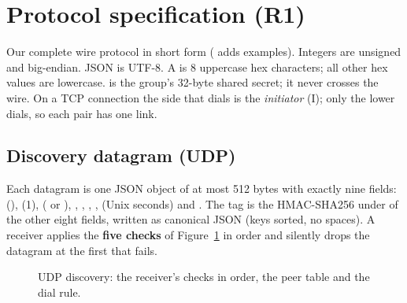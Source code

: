 \section{Protocol specification (R1)}
\label{sec:protocol}

Our complete wire protocol in short form ( adds examples). Integers are unsigned and big-endian. JSON is UTF-8. A  is 8
uppercase hex characters; all other hex values are lowercase.  is the group's 32-byte
shared secret; it never crosses the wire. On a TCP connection the side that
dials is the \emph{initiator} (I); only the lower  dials, so each pair has one link.

\subsection{Discovery datagram (UDP)}
\label{sec:proto-discovery}

Each datagram is one JSON object of at most 512 bytes with exactly nine fields: 
(),  (1),  ( or ), ,
, , ,  (Unix seconds) and . The tag is
the HMAC-SHA256 under  of the other eight fields, written as canonical JSON (keys sorted,
no spaces). A receiver applies the \textbf{five checks} of Figure~\ref{fig:discovery} in order and
silently drops the datagram at the first that fails.

\begin{figure}[H]\centering
  \scalebox{0.85}{}
  \caption{UDP discovery: the receiver's checks in order, the peer table and the dial rule.}
  \label{fig:discovery}
\end{figure}

